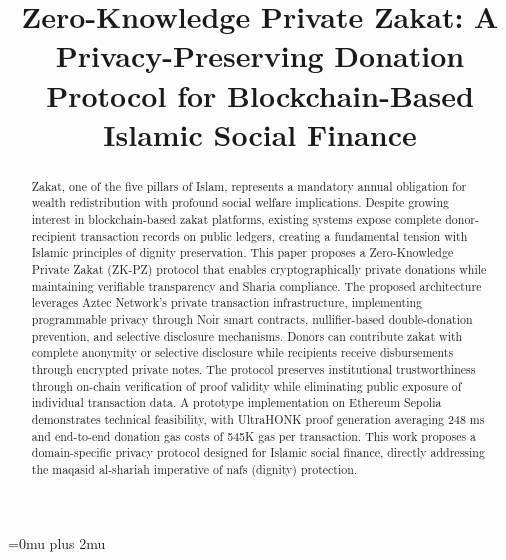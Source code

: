\documentclass[conference]{IEEEtran}
\begin{document}
\Urlmuskip=0mu plus 2mu

\title{Zero-Knowledge Private Zakat: A Privacy-Preserving Donation Protocol for Blockchain-Based Islamic Social Finance}

\author{
\and
{}
}

\maketitle

\begin{abstract}
Zakat, one of the five pillars of Islam, represents a mandatory annual obligation for wealth redistribution with profound social welfare implications. Despite growing interest in blockchain-based zakat platforms, existing systems expose complete donor-recipient transaction records on public ledgers, creating a fundamental tension with Islamic principles of dignity preservation. This paper proposes a Zero-Knowledge Private Zakat (ZK-PZ) protocol that enables cryptographically private donations while maintaining verifiable transparency and Sharia compliance. The proposed architecture leverages Aztec Network's private transaction infrastructure, implementing programmable privacy through Noir smart contracts, nullifier-based double-donation prevention, and selective disclosure mechanisms. Donors can contribute zakat with complete anonymity or selective disclosure while recipients receive disbursements through encrypted private notes. The protocol preserves institutional trustworthiness through on-chain verification of proof validity while eliminating public exposure of individual transaction data. A prototype implementation on Ethereum Sepolia demonstrates technical feasibility, with UltraHONK proof generation averaging 248 ms and end-to-end donation gas costs of 545K gas per transaction. This work proposes a domain-specific privacy protocol designed for Islamic social finance, directly addressing the maqasid al-shariah imperative of nafs (dignity) protection.
\end{abstract}
\end{document}
